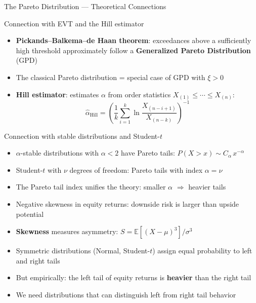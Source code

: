 \documentclass[9pt, aspectratio=169, t]{beamer}
\theoremstyle{definition}
\newcommand{\E}{\mathbb{E}}
\begin{document}
\begin{frame}{The Pareto Distribution --- Theoretical Connections}
\small
\vspace{-0.3cm}
\begin{block}{Connection with EVT and the Hill estimator}
\begin{itemize}\setlength\itemsep{1pt}
\item \textbf{Pickands--Balkema--de Haan theorem}: exceedances above a sufficiently high threshold approximately follow a \textbf{Generalized Pareto Distribution} (GPD)
\item The classical Pareto distribution = special case of GPD with $\xi > 0$
\item \textbf{Hill estimator}: estimates $\alpha$ from order statistics $X_{(1)} \leq \cdots \leq X_{(n)}$:
\[
\hat{\alpha}_{\text{Hill}} = \left(\frac{1}{k}\sum_{i=1}^{k} \ln \frac{X_{(n-i+1)}}{X_{(n-k)}}\right)^{-1}
\]
\end{itemize}
\end{block}

\begin{block}{Connection with stable distributions and Student-$t$}
\begin{itemize}\setlength\itemsep{1pt}
\item $\alpha$-stable distributions with $\alpha < 2$ have Pareto tails: $P(X > x) \sim C_\alpha\, x^{-\alpha}$
\item Student-$t$ with $\nu$ degrees of freedom: Pareto tails with index $\alpha = \nu$
\item The Pareto tail index unifies the theory: smaller $\alpha$ $\Rightarrow$ heavier tails
\end{itemize}
\end{block}
\end{frame}


\begin{itemize}
\item Negative skewness in equity returns: downside risk is larger than upside potential
\item \textbf{Skewness} measures asymmetry: $S = \E[(X-\mu)^3]/\sigma^3$
\item Symmetric distributions (Normal, Student-$t$) assign equal probability to left and right tails
\item But empirically: the left tail of equity returns is \textbf{heavier} than the right tail
\item We need distributions that can distinguish left from right tail behavior
\end{itemize}
\end{document}
